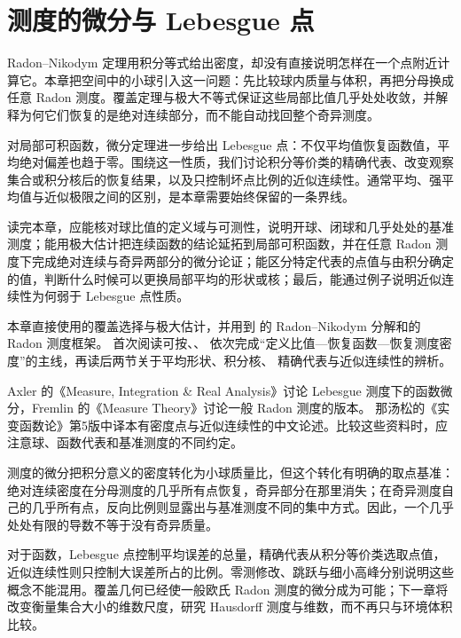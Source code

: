 \chapter{测度的微分与 Lebesgue 点}
\label{b1:ch:14}
\begin{chapterabstract}
Radon--Nikodym 定理用积分等式给出密度，却没有直接说明怎样在一个点附近计算它。本章把空间中的小球引入这一问题：先比较球内质量与体积，再把分母换成任意 Radon 测度。覆盖定理与极大不等式保证这些局部比值几乎处处收敛，并解释为何它们恢复的是绝对连续部分，而不能自动找回整个奇异测度。

对局部可积函数，微分定理进一步给出 Lebesgue 点：不仅平均值恢复函数值，平均绝对偏差也趋于零。围绕这一性质，我们讨论积分等价类的精确代表、改变观察集合或积分核后的恢复结果，以及只控制坏点比例的近似连续性。通常平均、强平均值与近似极限之间的区别，是本章需要始终保留的一条界线。
\end{chapterabstract}

\begin{learninggoals}
读完本章，应能核对球比值的定义域与可测性，说明开球、闭球和几乎处处的基准测度；能用极大估计把连续函数的结论延拓到局部可积函数，并在任意 Radon 测度下完成绝对连续与奇异两部分的微分论证；能区分特定代表的点值与由积分确定的值，判断什么时候可以更换局部平均的形状或核；最后，能通过例子说明近似连续性为何弱于 Lebesgue 点性质。
\end{learninggoals}

本章直接使用的覆盖选择与极大估计，并用到
的 Radon--Nikodym 分解和的 Radon 测度框架。
首次阅读可按、、
依次完成“定义比值—恢复函数—恢复测度密度”的主线，再读后两节关于平均形状、积分核、
精确代表与近似连续性的辨析。

\ProseParagraphBreak

Axler 的《Measure, Integration \& Real Analysis》讨论 Lebesgue 测度下的函数微分，Fremlin 的《Measure Theory》讨论一般 Radon 测度的版本\cite{Axler2020Measure,Fremlin2016Measure}。
那汤松的《实变函数论》第5版中译本\cite{Natanson2010RealChinese}有密度点与近似连续性的中文论述。比较这些资料时，应注意球、函数代表和基准测度的不同约定。






\begin{chaptersummary}
测度的微分把积分意义的密度转化为小球质量比，但这个转化有明确的取点基准：绝对连续密度在分母测度的几乎所有点恢复，奇异部分在那里消失；在奇异测度自己的几乎所有点，反向比例则显露出与基准测度不同的集中方式。因此，一个几乎处处有限的导数不等于没有奇异质量。

\ProseParagraphBreak

对于函数，Lebesgue 点控制平均误差的总量，精确代表从积分等价类选取点值，近似连续性则只控制大误差所占的比例。零测修改、跳跃与细小高峰分别说明这些概念不能混用。覆盖几何已经使一般欧氏 Radon 测度的微分成为可能；下一章将改变衡量集合大小的维数尺度，研究 Hausdorff 测度与维数，而不再只与环境体积比较。
\end{chaptersummary}


